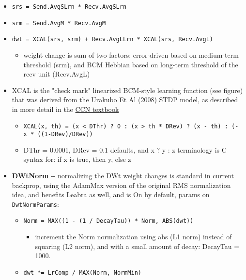 \begin{itemize}
  \begin{itemize}
  \item
    \texttt{srs\ =\ Send.AvgSLrn\ *\ Recv.AvgSLrn}
  \item
    \texttt{srm\ =\ Send.AvgM\ *\ Recv.AvgM}
  \item
    \texttt{dwt\ =\ XCAL(srs,\ srm)\ +\ Recv.AvgLLrn\ *\ XCAL(srs,\ Recv.AvgL)}

    \begin{itemize}
    \tightlist
    \item
      weight change is sum of two factors: error-driven based on
      medium-term threshold (srm), and BCM Hebbian based on long-term
      threshold of the recv unit (Recv.AvgL)
    \end{itemize}
  \item
    XCAL is the "check mark" linearized BCM-style learning function (see
    figure) that was derived from the Urakubo Et Al (2008) STDP model,
    as described in more detail in the
    \href{https://CompCogNeuro.org}{CCN textbook}

    \begin{itemize}
    \tightlist
    \item
      \texttt{XCAL(x,\ th)\ =\ (x\ \textless{}\ DThr)\ ?\ 0\ :\ (x\ \textgreater{}\ th\ *\ DRev)\ ?\ (x\ -\ th)\ :\ (-x\ *\ ((1-DRev)/DRev))}
    \item
      DThr = 0.0001, DRev = 0.1 defaults, and x ? y : z terminology is C
      syntax for: if x is true, then y, else z
    \end{itemize}
  \item
    \textbf{DWtNorm} -\/- normalizing the DWt weight changes is standard
    in current backprop, using the AdamMax version of the original RMS
    normalization idea, and benefits Leabra as well, and is On by
    default, params on \texttt{DwtNormParams}:

    \begin{itemize}
    \tightlist
    \item
      \texttt{Norm\ =\ MAX((1\ -\ (1\ /\ DecayTau))\ *\ Norm,\ ABS(dwt))}

      \begin{itemize}
      \tightlist
      \item
        increment the Norm normalization using abs (L1 norm) instead of
        squaring (L2 norm), and with a small amount of decay: DecayTau =
        1000.
      \end{itemize}
    \item
      \texttt{dwt\ *=\ LrComp\ /\ MAX(Norm,\ NormMin)}


\end{itemize}
\end{itemize}
\end{itemize}
